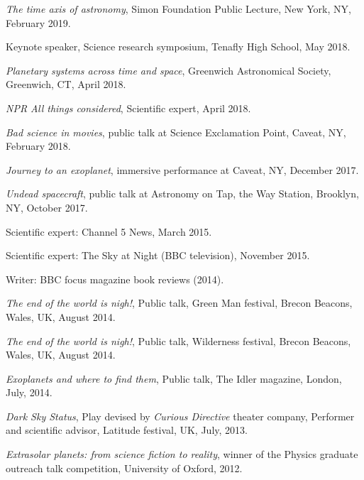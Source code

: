 \documentclass[12pt,letterpaper]{article}
\begin{document}
\begin{list}{}{\cvlist}
\item
    {\it The time axis of astronomy}, Simon Foundation Public Lecture,
    New York, NY, February 2019.
\item Keynote speaker, Science research symposium, Tenafly High School,
    May 2018.
\item
    {\it Planetary systems across time and space}, Greenwich Astronomical
    Society, Greenwich, CT, April 2018.
\item
    {\it NPR All things considered}, Scientific expert, April 2018.
\item
    {\it Bad science in movies}, public talk at Science Exclamation Point,
    Caveat, NY, February 2018.
\item{\it Journey to an exoplanet}, immersive performance at Caveat, NY,
    December 2017.
\item{\it Undead spacecraft}, public talk at Astronomy on Tap, the Way
    Station, Brooklyn, NY, October 2017.
\item
Scientific expert: Channel 5 News, March 2015.
\item
Scientific expert: The Sky at Night (BBC television), November 2015.
\item
Writer: BBC focus magazine book reviews (2014).
\item
{\it The end of the world is nigh!}, Public talk, Green Man festival, Brecon
Beacons, Wales, UK, August 2014.
\item
{\it The end of the world is nigh!}, Public talk, Wilderness festival, Brecon
Beacons, Wales, UK, August 2014.
\item
{\it Exoplanets and where to find them}, Public talk, The Idler magazine,
London, July, 2014.
\item
{\it Dark Sky Status}, Play devised by {\it Curious Directive} theater
    company, Performer and scientific advisor, Latitude festival, UK, July,
    2013.
\item
{\it Extrasolar planets: from science fiction to reality}, winner of the
Physics graduate outreach talk competition, University of Oxford, 2012.
\end{list}
\end{document}
